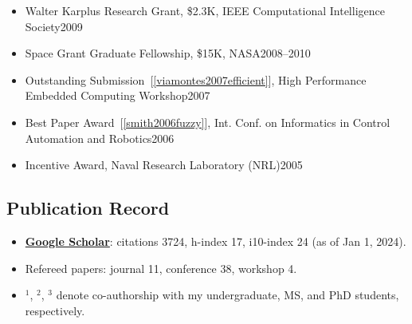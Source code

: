\documentclass[11pt]{article}
\newcommand{\mygooglescholar}{\href{https://scholar.google.com/citations?user=TLcVQ-MAAAAJ}{Google Scholar}}
\begin{document}
\begin{itemize}
\item Walter Karplus Research Grant, \$2.3K, IEEE Computational Intelligence Society\hfill 2009 
\item Space Grant Graduate Fellowship, \$15K, NASA\hfill 2008--2010 
\item Outstanding Submission~[\ref{viamontes2007efficient}], High Performance Embedded Computing Workshop\hfill 2007
\item  Best Paper Award~[\ref{smith2006fuzzy}],  Int. Conf. on Informatics in Control Automation and Robotics\hfill 2006
\item Incentive Award,  Naval Research Laboratory (NRL)\hfill 2005
\end{itemize}

\subsection{Publication Record}

\begin{itemize}[label={},before=\small]
\item \textbf{\mygooglescholar{}}: citations 3724, h-index 17, i10-index 24 (as of Jan 1, 2024).
\item Refereed papers:  journal 11, conference 38, workshop 4.
\item \(^1\), \(^2\), \(^3\) denote co-authorship with my undergraduate, MS, and PhD students, respectively.
\end{itemize}
\end{document}

